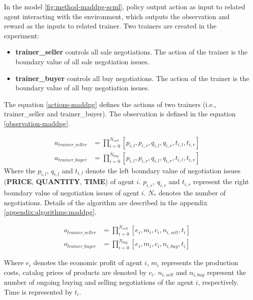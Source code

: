 In the model \ref{fig:method-maddpg-scml}, policy output action as input to related agent interacting with the environment, which outputs the observation and reward as the inputs to related trainer. Two trainers are created in the experiment:
\begin{itemize}
\item \textbf{trainer\_seller} controls all sale negotiations. The action of the trainer is the boundary value of all sale negotiation issues.
\item \textbf{trainer\_buyer} controls all buy negotiations. The action of the trainer is the boundary value of all buy negotiation issues.
\end{itemize}

The equation \ref{actions-maddpg} defines the actions of two trainers (i.e., trainer\_seller and trainer\_buyer). The observation is defined in the equation \ref{observation-maddpg}.

\begin{equation} \label{actions-maddpg}
\begin{aligned}
a_{trainer\_seller} & = \prod_{i=0}^{N_{sell}}[p_{i, l}, p_{i, r}, q_{i, l}, q_{i, r}, t_{i, l}, t_{i, r}] \\
a_{trainer\_buyer} & = \prod_{i=0}^{N_{buy}}[p_{i, l}, p_{i, r}, q_{i, l}, q_{i, r}, t_{i, l}, t_{i, r}]
\end{aligned}
\end{equation}
Where the $p_{i, l}$, $q_{i, l}$ and $t_{i, l}$ denote the left boundary value of negotiation issues (\textbf{PRICE}, \textbf{QUANTITY}, \textbf{TIME}) of agent $i$. $p_{i, r}$, $q_{i, r}$ and $t_{i, r}$ represent the right boundary value of negotiation issues of agent $i$. $N_{*}$ denotes the number of negotiations. Details of the algorithm are described in the appendix \ref{appendix:algorithms:maddpg}.  

\begin{equation} \label{observation-maddpg}
\begin{aligned}
o_{trainer\_seller} &= \prod_{i=0}^{N_{sell}}[e_{i}, m_{i}, c_{i}, n_{i, sell}, t_{i}] \\
o_{trainer\_buyer} &= \prod_{i=0}^{N_{buy}}[e_{i}, m_{i}, c_{i}, n_{i, buy}, t_{i}]
\end{aligned} 
\end{equation}

Where $e_{i}$ denotes the economic profit of agent $i$, $m_{i}$ represents the production costs, catalog prices of products are denoted by $c_{i}$. $n_{i, sell}$ and $n_{i, buy}$ represent the number of ongoing buying and selling negotiations of the agent $i$, respectively. Time is represented by $t_{i}$. 


